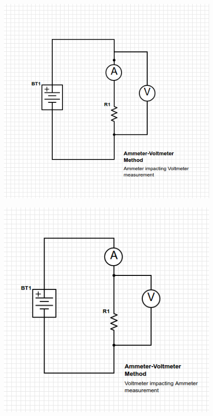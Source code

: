 \documentclass[11pt, titlepage]{article}
\begin{document}
\begin{figure}[h]
\centering
\hspace*{0cm}
\includegraphics[scale=1, angle=0]{circuit1.jpg}
\vspace*{0cm}
\end{figure}

\begin{figure}[h]
\centering
\hspace*{0cm}
\includegraphics[scale=1, angle=0]{circuit2.jpg}
\vspace*{0cm}
\end{figure}
\end{document}
